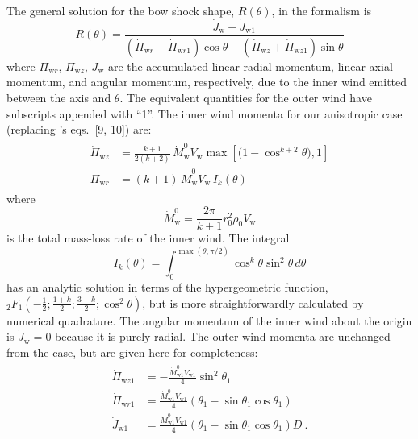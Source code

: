 \documentclass[useAMS, usenatbib, a4paper]{mnras}
\newcommand\w{\ensuremath{\mathrm{w}}}
\begin{document}
The general solution for the bow shock shape, \(R(\theta)\), in the \CRW{}
formalism is
\begin{equation}
  R(\theta) = \frac {\dot{J}_{\w} + \dot{J}_{\w{}1}}
  {\left(\dot{\Pi}_{\w{}r}+\dot{\Pi}_{\w{}r1}\right)\cos\theta
    - \left(\dot{\Pi}_{\w{}z}+\dot{\Pi}_{\w{}z1}\right)\sin\theta}
  \label{eq:Rmom}
\end{equation}
where \(\dot{\Pi}_{\w{}r}\), \(\dot{\Pi}_{\w{}z}\), \(\dot{J}_{\w}\) are
the accumulated linear radial momentum, linear axial momentum, and
angular momentum, respectively, due to the inner wind emitted between
the axis and \(\theta\). The equivalent quantities for the outer wind have
subscripts appended with ``1''.  The inner wind momenta for our
anisotropic case (replacing \CRW{}'s eqs.~[9, 10]) are:
\begin{gather}
  \label{eq:ancantoid-momenta}
  \begin{aligned}
    \dot{\Pi}_{\w{}z} &= \frac{k + 1}{2(k+2)}\, \dot{M}_{\w}^0 V_{\w}
    \max\left[\bigl(1- \cos^{k+2} \theta\bigr), 1 \right] \\
    \dot{\Pi}_{\w{}r} &= (k + 1)\, \dot{M}^0_{\w} V_{\w}\, I_k (\theta) 
  \end{aligned}
\end{gather}
where
\begin{equation}
  \label{eq:ancantoid-mass-loss}
  \dot{M}^0_{\w} = \frac{2 \pi} {k + 1} r_0^2 \rho_0 V_{\w}
\end{equation}
is the total mass-loss rate of the inner wind. The integral
\begin{equation}
  \label{eq:ancantoid-I-integral}
  I_k(\theta) = \int^{\max(\theta, \pi/2)}_0 \cos^k \theta \sin^2\theta \,d\theta 
\end{equation}
has an analytic solution in terms of the hypergeometric function,
\({}_2 F_1(-\tfrac12; \tfrac{1+k}2; \tfrac{3+k}2; \cos^2 \theta)\), but is
more straightforwardly calculated by numerical quadrature.  The
angular momentum of the inner wind about the origin is
\(\dot{J}_{\w} = 0\) because it is purely radial.  The outer wind
momenta are unchanged from the \CRW{} case, but are given here for
completeness:
\begin{gather}
  \label{eq:ancantoid-momenta-outer}
  \begin{aligned}
    \dot{\Pi}_{\w{}z1} & =
    -\frac{\dot{M}^0_{\w{}1}V_{\w{}1}}{4}\sin^2\theta_1\\
    \dot{\Pi}_{\w{}r1} & =
    \frac{\dot{M}^0_{\w{}1}V_{\w{}1}}{4}\left(\theta_1-\sin\theta_1\cos\theta_1\right)\\
    \dot{J}_{\w{}1} & =
    \frac{\dot{M}^0_{\w{}1}V_{\w{}1}}{4}\left(\theta_1-\sin\theta_1\cos\theta_1\right)D \ .
  \end{aligned} 
\end{gather}
\end{document}
